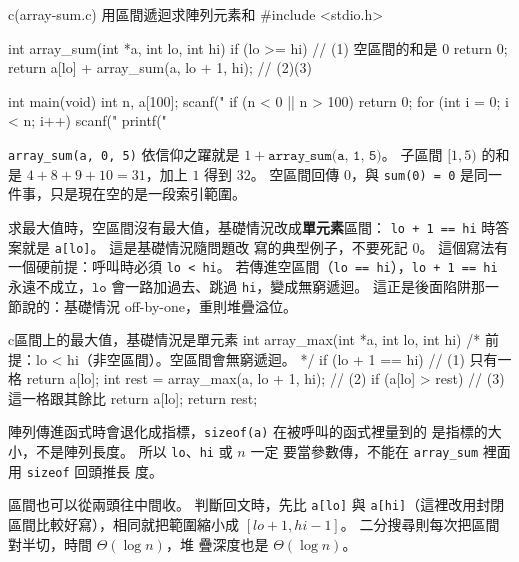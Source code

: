 \begin{example}{c}{(array-sum.c) 用區間遞迴求陣列元素和}
#include <stdio.h>

int array_sum(int *a, int lo, int hi) {
    if (lo >= hi) {                    // (1) 空區間的和是 0
        return 0;
    }
    return a[lo] + array_sum(a, lo + 1, hi);  // (2)(3)
}

int main(void) {
    int n, a[100];
    scanf("%
    if (n < 0 || n > 100) {
        return 0;
    }
    for (int i = 0; i < n; i++) {
        scanf("%
    }
    printf("%
}
\end{example}


\texttt{array\_sum(a, 0, 5)} 依信仰之躍就是 $1 + \texttt{array\_sum(a, 1, 5)}$。
子區間 $[1, 5)$ 的和是 $4+8+9+10 = 31$，加上 $1$ 得到 $32$。 空區間回傳
$0$，與 \texttt{sum(0) = 0} 是同一件事，只是現在空的是一段索引範圍。

求最大值時，空區間沒有最大值，基礎情況改成\textbf{單元素}區間：
\texttt{lo + 1 == hi} 時答案就是 \texttt{a[lo]}。 這是基礎情況隨問題改
寫的典型例子，不要死記 $0$。 這個寫法有一個硬前提：呼叫時必須
\texttt{lo < hi}。 若傳進空區間（\texttt{lo == hi}），\texttt{lo + 1 == hi}
永遠不成立，$\texttt{lo}$ 會一路加過去、跳過 \texttt{hi}，變成無窮遞迴。
這正是後面陷阱那一節說的：基礎情況 off-by-one，重則堆疊溢位。

\begin{code}{c}{區間上的最大值，基礎情況是單元素}
int array_max(int *a, int lo, int hi) {
    /* 前提：lo < hi（非空區間）。空區間會無窮遞迴。 */
    if (lo + 1 == hi) {                // (1) 只有一格
        return a[lo];
    }
    int rest = array_max(a, lo + 1, hi); // (2)
    if (a[lo] > rest) {                // (3) 這一格跟其餘比
        return a[lo];
    }
    return rest;
}
\end{code}

陣列傳進函式時會退化成指標，\texttt{sizeof(a)} 在被呼叫的函式裡量到的
是指標的大小，不是陣列長度。 所以 \texttt{lo}、\texttt{hi} 或 $n$ 一定
要當參數傳，不能在 \texttt{array\_sum} 裡面用 \texttt{sizeof} 回頭推長
度。

區間也可以從兩頭往中間收。 判斷回文時，先比 \texttt{a[lo]} 與
\texttt{a[hi]}（這裡改用封閉區間比較好寫），相同就把範圍縮小成
$[lo+1, hi-1]$。 二分搜尋則每次把區間對半切，時間 $\Theta(\log n)$，堆
疊深度也是 $\Theta(\log n)$。

